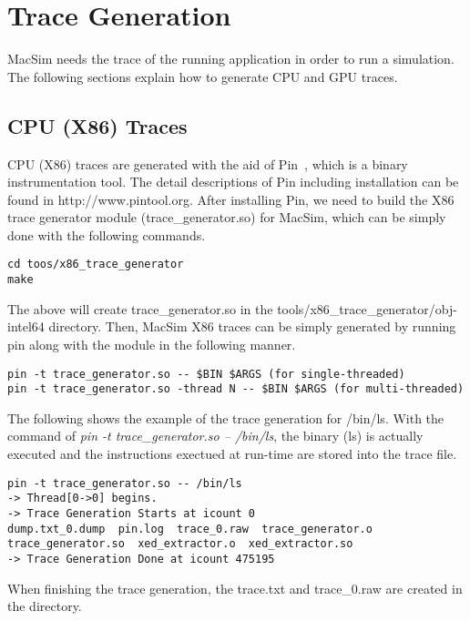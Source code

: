 
\clearpage
\section{Trace Generation}

MacSim needs the trace of the running application in order to run a simulation.
The following sections explain how to generate CPU and GPU traces.

\subsection{CPU (X86) Traces}

CPU (X86) traces are generated with the aid of Pin~\cite{}, which is a binary instrumentation tool.
The detail descriptions of Pin including installation can be found in http://www.pintool.org. 
After installing Pin, we need to build the X86 trace generator module (trace\_generator.so) for MacSim, which can be 
simply done with the following commands.

\smallskip
\begin{lstlisting}
cd toos/x86_trace_generator
make
\end{lstlisting}
\smallskip

The above will create trace\_generator.so in the tools/x86\_trace\_generator/obj-intel64 directory.
Then, MacSim X86 traces can be simply generated by running pin along with the module in the following manner.

\smallskip
\begin{lstlisting}
pin -t trace_generator.so -- $BIN $ARGS (for single-threaded)
pin -t trace_generator.so -thread N -- $BIN $ARGS (for multi-threaded)
\end{lstlisting}
\smallskip

The following shows the example of the trace generation for /bin/ls. 
With the command of \emph{pin -t trace\_generator.so -- /bin/ls}, the binary (ls) is 
actually executed and the instructions exectued at run-time are stored into the trace file.

\smallskip
\begin{lstlisting}
pin -t trace_generator.so -- /bin/ls
-> Thread[0->0] begins.
-> Trace Generation Starts at icount 0
dump.txt_0.dump  pin.log  trace_0.raw  trace_generator.o  trace_generator.so  xed_extractor.o  xed_extractor.so
-> Trace Generation Done at icount 475195
\end{lstlisting}
\smallskip

When finishing the trace generation, the trace.txt and trace\_0.raw are created in the directory.

